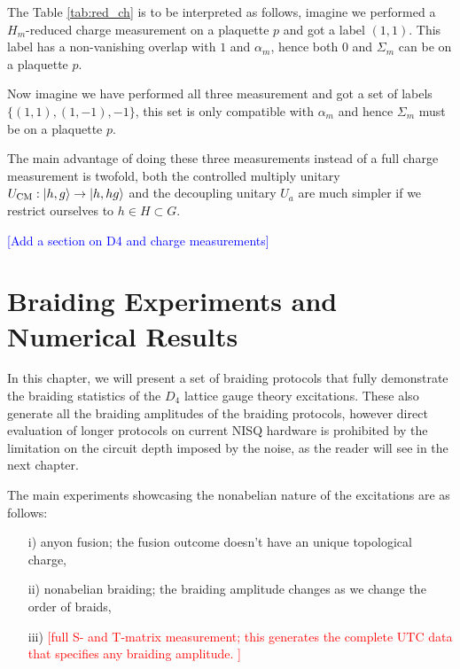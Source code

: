 \documentclass[two column]{article}
\newcommand{\caro}[1]{\textcolor{red}{[#1]}}
\newcommand{\jovan}[1]{\textcolor{blue}{[#1]}}
\begin{document}

The Table \ref{tab:red_ch} is to be interpreted as follows, imagine we performed a $H_m$-reduced charge measurement on a plaquette $p$ and got a label $(1,1)$. This label has a non-vanishing overlap with $1$ and $\alpha_m$, hence both $0$ and $\Sigma_m$ can be on a plaquette $p$.

Now imagine we have performed all three measurement and got a set of labels $\{(1, 1), (1, -1), -1\}$, this set is only compatible with $\alpha_m$ and hence $\Sigma_m$ must be on a plaquette $p$.


The main advantage of doing these three measurements instead of a full charge measurement is twofold, both the controlled multiply unitary $U_{\text{CM}}: \ket{h, g} \rightarrow \ket{h, hg}$ and the decoupling unitary $U_a$ are much simpler if we restrict ourselves to $h \in H \subset G$.


\jovan{Add a section on D4 and charge measurements}

\section{Braiding Experiments and Numerical Results}

In this chapter, we will present a set of braiding protocols that fully demonstrate the braiding statistics of the $D_4$ lattice gauge theory excitations. These also generate all the braiding amplitudes of the braiding protocols, however direct evaluation of longer protocols on current NISQ hardware is prohibited by the limitation on the circuit depth imposed by the noise, as the reader will see in the next chapter. 

The main experiments showcasing the nonabelian nature of the excitations are as follows:\begin{itemize}

\item[i)] anyon fusion; the fusion outcome doesn't have an unique topological charge,

\item[ii)] nonabelian braiding; the braiding amplitude changes as we change the order of braids,

\item[iii)] \caro{full S- and T-matrix measurement; this generates the complete UTC data that specifies any braiding amplitude.
} 
\end{itemize}
\end{document}
